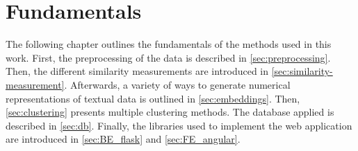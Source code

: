 \chapter{Fundamentals}\label{ch:methodology} %

The following chapter outlines the fundamentals of the methods used in this work.
First, the preprocessing of the data is described in \autoref{sec:preprocessing}.
Then, the different similarity measurements are introduced in \autoref{sec:similarity-measurement}.
Afterwards, a variety of ways to generate numerical representations of textual data is outlined in \autoref{sec:embeddings}.
Then, \autoref{sec:clustering} presents multiple clustering methods.
The database applied is described in \autoref{sec:db}.
Finally, the libraries used to implement the web application are introduced in \autoref{sec:BE_flask} and \autoref{sec:FE_angular}.


























